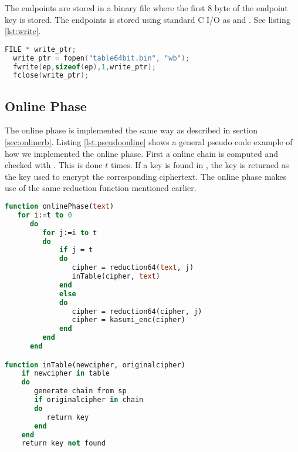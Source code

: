 The endpoints are stored in a binary file where the first 8 byte of
the endpoint key is stored. The endpoints is stored using standard C
I/O as  and . See listing \ref{lst:write}.
\newpage
\begin{lstlisting}[frame=single, language=C, mathescape,
captionpos=b, caption={Writing to a binary}, label={lst:write}]
  FILE * write_ptr;
  write_ptr = fopen("table64bit.bin", "wb");
  fwrite(ep,sizeof(ep),1,write_ptr);
  fclose(write_ptr);
\end{lstlisting}



\subsection{Online Phase}
The online phase is implemented the same way as described in section
\ref{sec:onlinerb}. Listing \ref{lst:pseudoonline} shows a general
pseudo code example of how we implemented the online phase. First a
online chain is computed and checked with . This is done
$t$ times. If a key is found in , the key is returned as
the key used to encrypt the corresponding ciphertext. The online phase
makes use of the same reduction function mentioned earlier.
\newpage
\begin{lstlisting}[frame=single, language=Pascal, mathescape,
captionpos=b, caption={Pseudo code for online phase}, label={lst:pseudoonline}]
function onlinePhase(text)
   for i:=t to 0
      do
         for j:=i to t
         do
             if j = t
             do
                cipher = reduction64(text, j)
                inTable(cipher, text)
             end
             else
             do
                cipher = reduction64(cipher, j)
                cipher = kasumi_enc(cipher)
             end
         end
      end

function inTable(newcipher, originalcipher)
    if newcipher in table
    do
       generate chain from sp
       if originalcipher in chain
       do
          return key
       end 
    end
    return key not found
\end{lstlisting}


